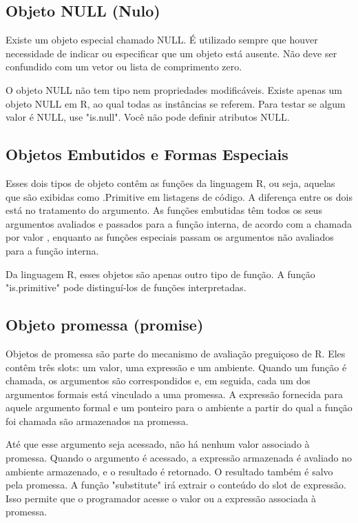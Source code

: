     \subsection{Objeto NULL (Nulo)}
      Existe um objeto especial chamado NULL. É utilizado sempre que houver necessidade de indicar ou especificar que um objeto está ausente. Não deve ser confundido com um vetor ou lista de comprimento zero.
      
      O objeto NULL não tem tipo nem propriedades modificáveis. Existe apenas um objeto NULL em R, ao qual todas as instâncias se referem. Para testar se algum valor é NULL, use "is.null". Você não pode definir atributos NULL.
    
    \subsection{Objetos Embutidos e Formas Especiais}
      Esses dois tipos de objeto contêm as funções da linguagem R, ou seja, aquelas que são exibidas como .Primitive em listagens de código. A diferença entre os dois está no tratamento do argumento. As funções embutidas têm todos os seus argumentos avaliados e passados para a função interna, de acordo com a chamada por valor , enquanto as funções especiais passam os argumentos não avaliados para a função interna.
      
      Da linguagem R, esses objetos são apenas outro tipo de função. A função "is.primitive" pode distinguí-los de funções interpretadas.
    
    \subsection{Objeto promessa (promise)}
      Objetos de promessa são parte do mecanismo de avaliação preguiçoso de R. Eles contêm três slots: um valor, uma expressão e um ambiente. Quando um função é chamada, os argumentos são correspondidos e, em seguida, cada um dos argumentos formais está vinculado a uma promessa. A expressão fornecida para aquele argumento formal e um ponteiro para o ambiente a partir do qual a função foi chamada são armazenados na promessa.
      
      Até que esse argumento seja acessado, não há nenhum valor associado à promessa. Quando o argumento é acessado, a expressão armazenada é avaliado no ambiente armazenado, e o resultado é retornado. O resultado também é salvo pela promessa. A função "substitute" irá extrair o conteúdo do slot de expressão. Isso permite que o programador acesse o valor ou a expressão associada à promessa.
      
